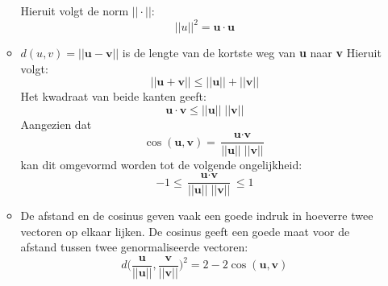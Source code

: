 \documentclass{report}
\begin{document}
\begin{itemize}
\begin{itemize}
		Hieruit volgt de norm $|| \cdot ||$: 
		$$||u||^2 = \textbf{u} \cdot \textbf{u}$$
		\item $d(u,v) = ||\textbf{u} -\textbf{v}||$ is de lengte van de kortste weg van \textbf{u} naar \textbf{v}
		 Hieruit volgt:
		$$||\textbf{u} + \textbf{v}|| \leq ||\textbf{u}||+||\textbf{v}||$$
		 Het kwadraat van beide kanten geeft:
		 $$\textbf{u} \cdot \textbf{v} \leq ||\textbf{u}||\;||\textbf{v}||$$
		 Aangezien dat 
		 $$\cos(\textbf{u}, \textbf{v}) = \frac{\textbf{u} \cdot \textbf{v}}{||\textbf{u} ||\;|| \textbf{v} ||}$$
		 kan dit omgevormd worden tot de volgende ongelijkheid:
		 $$-1 \leq \frac{\textbf{u} \cdot \textbf{v}}{||\textbf{u} ||\;|| \textbf{v} ||} \leq 1$$
		 \item De afstand en de cosinus geven vaak een goede indruk in hoeverre twee vectoren op elkaar lijken. De cosinus geeft een goede maat voor de afstand tussen twee genormaliseerde vectoren:
		 $$d\bigg(\frac{\textbf{u}}{||\textbf{u}||}, \frac{\textbf{v}}{||\textbf{v}||}\bigg)^2 = 2 - 2\cos(\textbf{u}, \textbf{v})$$
	\end{itemize}
\end{itemize}
\end{document}
